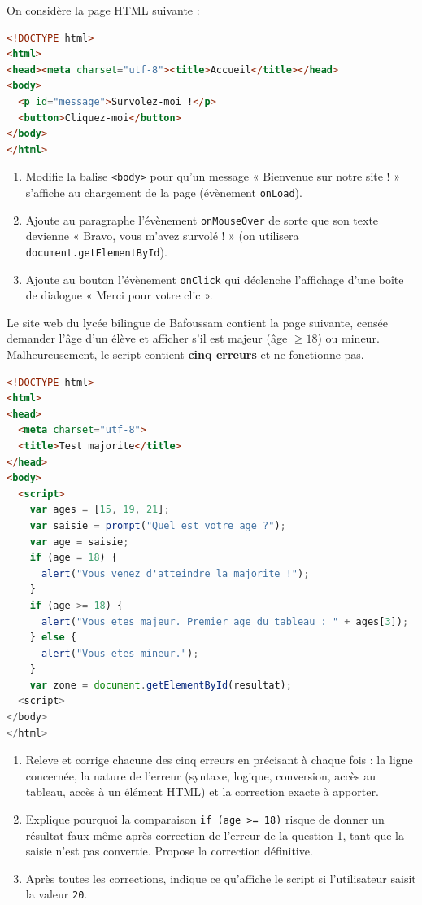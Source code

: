 \documentclass[11pt]{article}
\newcounter{popsec}
\newcounter{popsub}
\newcommand{\courssub}[1]{%
  \stepcounter{popsub}%
  \par\vspace{9pt}\noindent{\popxbold\fontsize{11.5}{13}\selectfont\color{popink}{\color{poporange}\thepopsec.\thepopsub}\hspace{6pt}#1}\par\nopagebreak\vspace{4pt}
}
\begin{document}
\begin{exercice}
On considère la page HTML suivante :
\begin{lstlisting}[language=HTML]
<!DOCTYPE html>
<html>
<head><meta charset="utf-8"><title>Accueil</title></head>
<body>
  <p id="message">Survolez-moi !</p>
  <button>Cliquez-moi</button>
</body>
</html>
\end{lstlisting}
\begin{enumerate}
\item Modifie la balise \texttt{<body>} pour qu'un message « Bienvenue sur notre site ! » s'affiche au chargement de la page (évènement \texttt{onLoad}).
\item Ajoute au paragraphe l'évènement \texttt{onMouseOver} de sorte que son texte devienne « Bravo, vous m'avez survolé ! » (on utilisera \texttt{document.getElementById}).
\item Ajoute au bouton l'évènement \texttt{onClick} qui déclenche l'affichage d'une boîte de dialogue « Merci pour votre clic ».
\end{enumerate}
\end{exercice}

\courssub{Je me prépare au Probatoire}

\begin{exercice}
Le site web du lycée bilingue de Bafoussam contient la page suivante, censée demander l'âge d'un élève et afficher s'il est majeur (âge $\geq 18$) ou mineur. Malheureusement, le script contient \textbf{cinq erreurs} et ne fonctionne pas.
\begin{lstlisting}[language=HTML]
<!DOCTYPE html>
<html>
<head>
  <meta charset="utf-8">
  <title>Test majorite</title>
</head>
<body>
  <script>
    var ages = [15, 19, 21];
    var saisie = prompt("Quel est votre age ?");
    var age = saisie;
    if (age = 18) {
      alert("Vous venez d'atteindre la majorite !");
    }
    if (age >= 18) {
      alert("Vous etes majeur. Premier age du tableau : " + ages[3]);
    } else {
      alert("Vous etes mineur.");
    }
    var zone = document.getElementById(resultat);
  <script>
</body>
</html>
\end{lstlisting}
\begin{enumerate}
\item Releve et corrige chacune des cinq erreurs en précisant à chaque fois : la ligne concernée, la nature de l'erreur (syntaxe, logique, conversion, accès au tableau, accès à un élément HTML) et la correction exacte à apporter.
\item Explique pourquoi la comparaison \texttt{if (age >= 18)} risque de donner un résultat faux même après correction de l'erreur de la question 1, tant que la saisie n'est pas convertie. Propose la correction définitive.
\item Après toutes les corrections, indique ce qu'affiche le script si l'utilisateur saisit la valeur \texttt{20}.
\end{enumerate}
\end{exercice}
\end{document}
